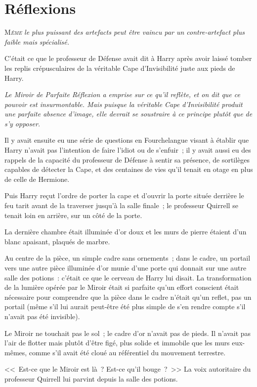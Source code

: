 \chapter{Réflexions}

\lettrine{M}{\emph{ême}} \emph{le plus puissant des artefacts peut être vaincu par un contre-artefact plus faible mais spécialisé.}

C'était ce que le professeur de Défense avait dit à Harry après avoir laissé tomber les replis crépusculaires de la véritable Cape d'Invisibilité juste aux pieds de Harry.

\emph{Le Miroir de Parfaite Réflexion a emprise sur ce qu'il reflète, et on dit que ce pouvoir est insurmontable. Mais puisque la véritable Cape d'Invisibilité produit une parfaite absence d'image, elle devrait se soustraire à ce principe plutôt que de s'y opposer.}

Il y avait ensuite eu une série de questions en Fourchelangue visant à établir que Harry n'avait pas l'intention de faire l'idiot ou de s'enfuir~; il y avait aussi eu des rappels de la capacité du professeur de Défense à sentir sa présence, de sortilèges capables de détecter la Cape, et des centaines de vies qu'il tenait en otage en plus de celle de Hermione.

Puis Harry reçut l'ordre de porter la cape et d'ouvrir la porte située derrière le feu tarit avant de la traverser jusqu'à la salle finale~; le professeur Quirrell se tenait loin en arrière, sur un côté de la porte.

La dernière chambre était illuminée d'or doux et les murs de pierre étaient d'un blanc apaisant, plaqués de marbre.

Au centre de la pièce, un simple cadre sans ornements~; dans le cadre, un portail vers une autre pièce illuminée d'or munie d'une porte qui donnait sur une autre salle des potions~: c'était ce que le cerveau de Harry lui disait. La transformation de la lumière opérée par le Miroir était si parfaite qu'un effort conscient était nécessaire pour comprendre que la pièce dans le cadre n'était qu'un reflet, pas un portail (même s'il lui aurait peut-être été plus simple de s'en rendre compte s'il n'avait pas été invisible).

Le Miroir ne touchait pas le sol~; le cadre d'or n'avait pas de pieds. Il n'avait pas l'air de flotter mais plutôt d'être figé, plus solide et immobile que les murs eux-mêmes, comme s'il avait été cloué au référentiel du mouvement terrestre.

<<~Est-ce que le Miroir est là~? Est-ce qu'il bouge~?~>> La voix autoritaire du professeur Quirrell lui parvint depuis la salle des potions.


